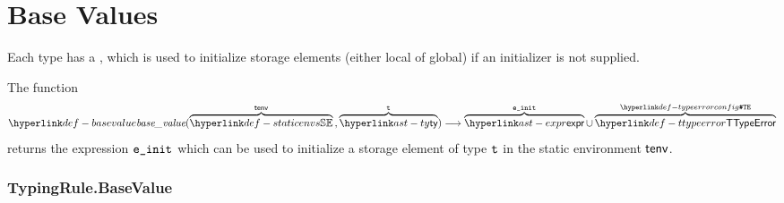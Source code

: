 \section{Base Values\label{sec:BaseValues}}

\hypertarget{def-basevalueterm}{}
Each type has a \basevalueterm, which is used to initialize storage elements (either local of global)
if an initializer is not supplied.

\hypertarget{def-basevalue}{}
The function
\[
\basevalue(\overname{\staticenvs}{\tenv} \aslsep \overname{\ty}{\vt}) \aslto
\overname{\expr}{\veinit} \cup \overname{\TTypeError}{\TypeErrorConfig}
\]
returns the expression $\texttt{e\_init}$ which can be used to initialize a storage element
of type $\texttt{t}$ in the static environment $\textsf{tenv}$.
\ProseOtherwiseTypeError

\subsubsection{TypingRule.BaseValue\label{sec:TypingRule.BaseValue}}
